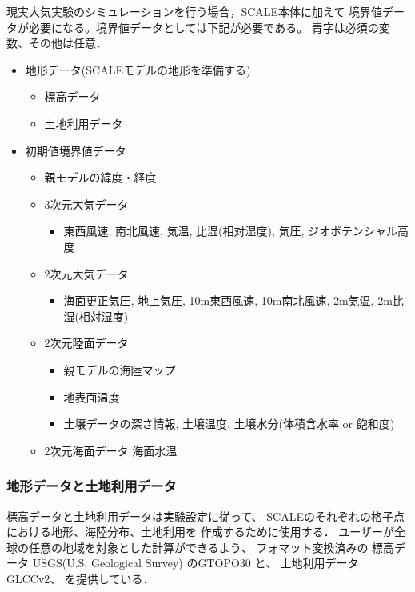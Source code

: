 現実大気実験のシミュレーションを行う場合，SCALE本体に加えて
境界値データが必要になる。境界値データとしては下記が必要である。
{\color{blue}青字}は必須の変数、その他は任意．

\begin{itemize}
\item 地形データ(SCALEモデルの地形を準備する)
 \begin{itemize}
  \item {\color{blue}標高データ}
  \item {\color{blue}土地利用データ}
 \end{itemize}
\item 初期値境界値データ
 \begin{itemize}
   \item {\color{blue}親モデルの緯度・経度}
   \item 3次元大気データ
     \begin{itemize}
       \item {\color{blue}東西風速, 南北風速, 気温, 比湿(相対湿度), 気圧, ジオポテンシャル高度}
     \end{itemize}
   \item 2次元大気データ
     \begin{itemize}
       \item 海面更正気圧, 地上気圧, 10m東西風速, 10m南北風速, 2m気温, 2m比湿(相対湿度)
     \end{itemize}
   \item 2次元陸面データ
     \begin{itemize}
       \item 親モデルの海陸マップ
       \item {\color{blue}地表面温度}
       \item {\color{blue}土壌データの深さ情報, 土壌温度}, 土壌水分(体積含水率 or 飽和度)
     \end{itemize}
   \item 2次元海面データ 海面水温
 \end{itemize}
\end{itemize}


\subsubsection{地形データと土地利用データ}
標高データと土地利用データは実験設定に従って、
SCALEのそれぞれの格子点における地形、海陸分布、土地利用を
作成するために使用する．
ユーザーが全球の任意の地域を対象とした計算ができるよう、
フォマット変換済みの
標高データ USGS(U.S. Geological Survey) のGTOPO30 と、
土地利用データ GLCCv2、
を提供している．

